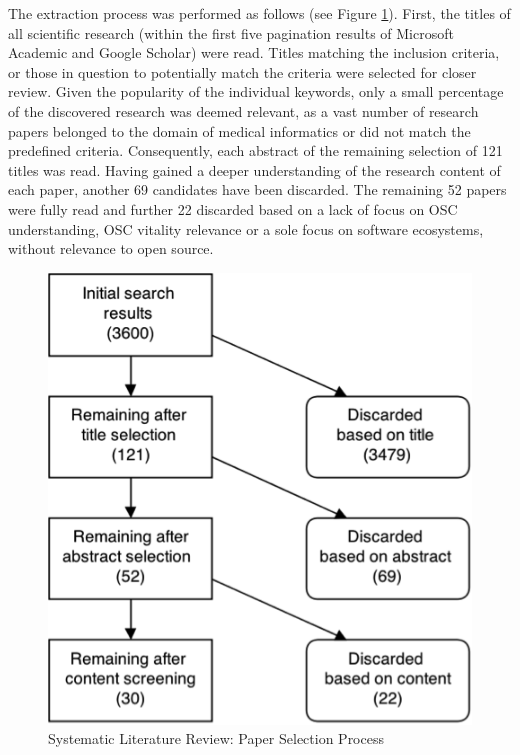 \documentclass[final,5p,times,twocolumn]{elsarticle}
\begin{document}
The extraction process was performed as follows (see Figure \ref{fig:systematic_selection}). First, the titles of all scientific research (within the first five pagination results of Microsoft Academic and Google Scholar) were read. Titles matching the inclusion criteria, or those in question to potentially match the criteria were selected for closer review. Given the popularity of the individual keywords, only a small percentage of the discovered research was deemed relevant, as a vast number of research papers belonged to the domain of medical informatics or did not match the predefined criteria. Consequently, each abstract of the remaining selection of 121 titles was read. Having gained a deeper understanding of the research content of each paper, another 69 candidates have been discarded. The remaining 52 papers were fully read and further 22 discarded based on a lack of focus on OSC understanding, OSC vitality relevance or a sole focus on software ecosystems, without relevance to open source.
\begin{figure}[htp]
\begin{center}
\includegraphics[scale=0.8]{figures/Systematic_literature_review.png}
\caption{Systematic Literature Review: Paper Selection Process}
\label{fig:systematic_selection}
\end{center}
\end{figure}
\end{document}
